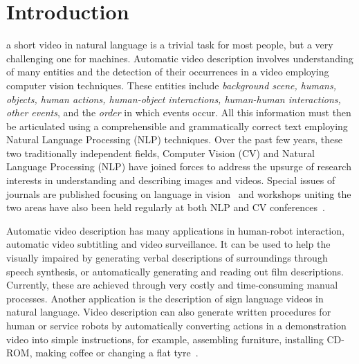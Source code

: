 \documentclass[10pt,journal,compsoc]{IEEEtran}
\begin{document}
\maketitle

\IEEEdisplaynontitleabstractindextext

\IEEEpeerreviewmaketitle

\ifCLASSOPTIONcompsoc
{}
\else
\section{Introduction}
\label{sec:introduction}
\fi

 a short video in natural language is a trivial task for most people, but a very challenging one for machines. Automatic video description involves understanding of many entities and the detection of their occurrences in a video employing computer vision techniques. These entities include \textit{background scene, humans, objects, human actions, human-object interactions, human-human interactions, other events}, and the \textit{order} in which events occur. All this information must then be articulated using a comprehensible and grammatically correct text employing Natural Language Processing (NLP) techniques. Over the past few years, these two traditionally independent fields, Computer Vision (CV) and Natural Language Processing (NLP) have joined forces to address the upsurge of research interests in understanding and describing images and videos. Special issues of journals are published focusing on language in vision~\cite{scidirlanginvision} and workshops uniting the two areas have also been held regularly at both NLP and CV conferences~\cite{languageandvisioncvpr2015, languageandvisioncvpr2018, languageandvisioniccv2015, languageandvisionnaacl2018}.


Automatic video description has many applications in human-robot interaction, automatic video subtitling and video surveillance. It can be used to help the visually impaired by generating verbal descriptions of surroundings through speech synthesis, or automatically generating and reading out film descriptions. Currently, these are achieved through very costly and time-consuming manual processes. Another application is the description of sign language videos in natural language. Video description can also generate written procedures for human or service robots by automatically converting actions in a demonstration video into simple instructions, for example, assembling furniture, installing CD-ROM, making coffee or changing a flat tyre~\cite{alayrac2016unsupervised, brand1997inverse}. 
% 
\end{document}
